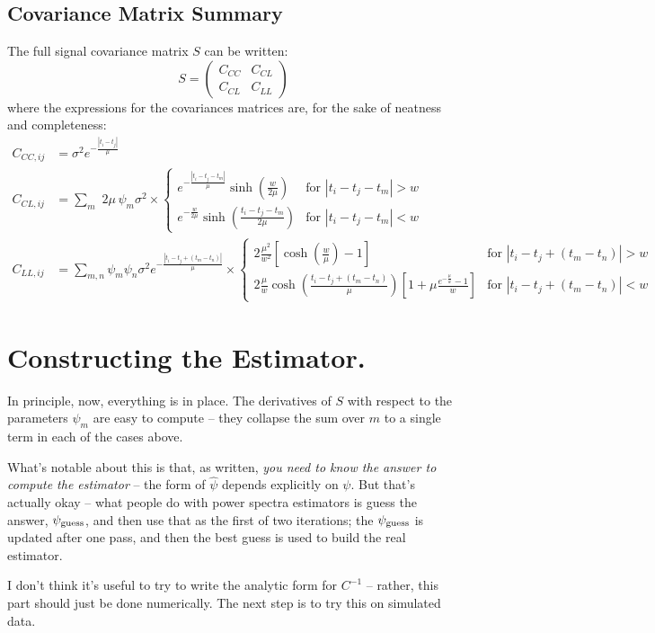 \documentclass[11pt,a4paper]{article}
\begin{document}
\subsection{Covariance Matrix Summary}
The full signal covariance matrix $S$ can be written:
\begin{equation}
S = \left(\begin{matrix}
C_{CC} & C_{CL} \\
C_{CL} & C_{LL}
\end{matrix}\right)
\label{eqn:Smatrix}
\end{equation}
where the expressions for the covariances matrices are, for the sake
of neatness and completeness:
\begin{align}
  C_{CC,ij}& = \sigma^2e^{-\frac{|t_i-t_j|}{\mu}} \\
 C_{CL,ij}&=\sum\limits_{m}\,\,2\mu\,\psi_m\sigma^2\times
  \begin{cases}
    e^{-\frac{|t_i-t_j-t_m|}{\mu}}\sinh\left(\frac{w}{2\mu}\right) &
    \text{for
      $|t_i-t_j-t_m|>w$} \\
    e^{-\frac{w}{2\mu}}\sinh\left(\frac{t_i-t_j-t_m}{2\mu}\right) &
    \text{for $|t_i-t_j-t_m|<w$}
  \end{cases} \\
  C_{LL,ij}&=
  \sum\limits_{m,n}\psi_m\psi_n\sigma^2e^{-\frac{|t_i-t_j+(t_m-t_n)|}{\mu}}\times  
  \begin{cases}
    2\frac{\mu^2}{w^2}\left[\cosh\left(\frac{w}{\mu}\right)-1\right] & \text{for
      $|t_i-t_j+(t_m-t_n)|>w$} \\
    2\frac{\mu}{w}\cosh\left(\frac{t_i-t_j+(t_m-t_n)}{\mu}\right)\left[1+\mu\frac{e^{-\frac{\mu}{w}}-1}{w}\right]
      & \text{for $|t_i-t_j+(t_m-t_n)|<w$}
    \end{cases}
\end{align}



\section{Constructing the Estimator.}
In principle, now, everything is in place. The derivatives of $S$ with
respect to the parameters $\psi_m$ are easy to compute -- they
collapse the sum over $m$ to a single term in each of the cases
above. 

What's notable about this is that, as written, {\it you need to know
  the answer to compute the estimator} -- the form of $\hat{\psi}$
depends explicitly on $\psi$. But that's actually okay -- what people
do with power spectra estimators is guess the answer, $\psi_{\rm
  guess}$, and then use that as the first of two iterations; the
$\psi_{\rm guess}$ is updated after one pass, and then the best guess
is used to build the real estimator.

I don't think it's useful to try to write the analytic form for
$C^{-1}$ -- rather, this part should just be done numerically. The
next step is to try this on simulated data.
\end{document}
